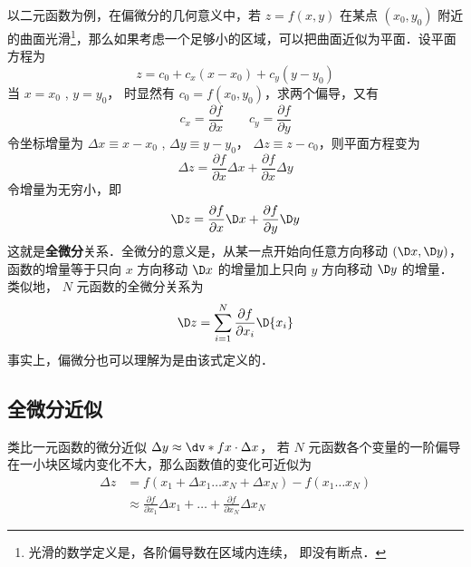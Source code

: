

以二元函数为例，在偏微分的几何意义中，若 $z = f(x,y)$ 在某点 $({x_0},{y_0})$ 附近的曲面光滑\footnote{光滑的数学定义是，各阶偏导数在区域内连续， 即没有断点．}，那么如果考虑一个足够小的区域，可以把曲面近似为平面．设平面方程为
\begin{equation}
z = {c_0} + {c_x}(x - {x_0}) + {c_y}(y - {y_0})
\end{equation}
当 $x=x_0$ , $y=y_0$， 时显然有 ${c_0} = f({x_0},{y_0})$，求两个偏导，又有
\begin{equation}
{c_x} = \frac{{\partial f}}{{\partial x}} \qquad {c_y} = \frac{{\partial f}}{{\partial y}}
\end{equation}
令坐标增量为 $\Delta x \equiv x - {x_0}$ , $\Delta y \equiv y - {y_0}$，  $\Delta z \equiv z - {c_0}$，则平面方程变为
\begin{equation}
\Delta z = \frac{{\partial f}}{{\partial x}}\Delta x + \frac{{\partial f}}{{\partial x}}\Delta y
\end{equation}
令增量为无穷小，即
 \begin{equation}
\D z = \frac{{\partial f}}{{\partial x}}\D x + \frac{{\partial f}}{{\partial y}}\D y
\end{equation}
这就是\textbf{全微分}关系．全微分的意义是，从某一点开始向任意方向移动 $(\D x,\D y)$，函数的增量等于只向 $x$ 方向移动 $\D x$ 的增量加上只向 $y$ 方向移动 $\D y$ 的增量．类似地， $N$ 元函数的全微分关系为
\begin{equation}
\D z = \sum_{i = 1}^{N}\frac{{\partial f}}{{\partial {x_i}}}\D{x_i}
\end{equation}
事实上，偏微分也可以理解为是由该式定义的．

\subsection{全微分近似}
类比一元函数的微分近似 $\Delta y \approx \dv*{f}{x}\cdot \Delta x$， 若 $N$ 元函数各个变量的一阶偏导在一小块区域内变化不大，那么函数值的变化可近似为
\begin{equation}\label{TDiff_eq6}
\begin{aligned}
\Delta z &= f(x_1+\Delta x_1\ldots x_N + \Delta x_N) - f(x_1\ldots x_N) \\
&\approx \frac{{\partial f}}{{\partial {x_1}}}\Delta {x_1} +\ldots + \frac{{\partial f}}{{\partial {x_N}}}\Delta {x_N}
\end{aligned}\end{equation}

